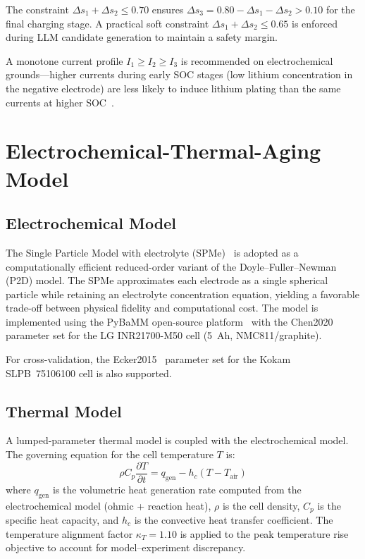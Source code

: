 \documentclass[journal]{IEEEtran}
\begin{document}
The constraint $\Delta s_1 + \Delta s_2 \leq 0.70$ ensures $\Delta s_3 = 0.80 - \Delta s_1 - \Delta s_2 > 0.10$ for the final charging stage. A practical soft constraint $\Delta s_1 + \Delta s_2 \leq 0.65$ is enforced during LLM candidate generation to maintain a safety margin.

A monotone current profile $I_1 \geq I_2 \geq I_3$ is recommended on electrochemical grounds---higher currents during early SOC stages (low lithium concentration in the negative electrode) are less likely to induce lithium plating than the same currents at higher SOC~\cite{ref2}.

\section{Electrochemical-Thermal-Aging Model}
\label{sec:model}

\subsection{Electrochemical Model}

The Single Particle Model with electrolyte (SPMe)~\cite{ref11} is adopted as a computationally efficient reduced-order variant of the Doyle--Fuller--Newman (P2D) model. The SPMe approximates each electrode as a single spherical particle while retaining an electrolyte concentration equation, yielding a favorable trade-off between physical fidelity and computational cost. The model is implemented using the PyBaMM open-source platform~\cite{ref12} with the Chen2020~\cite{ref13} parameter set for the LG INR21700-M50 cell (5~Ah, NMC811/graphite).

For cross-validation, the Ecker2015~\cite{ref14} parameter set for the Kokam SLPB~75106100 cell is also supported.

\subsection{Thermal Model}

A lumped-parameter thermal model is coupled with the electrochemical model. The governing equation for the cell temperature $T$ is:
\begin{equation}
\rho C_p \frac{\partial T}{\partial t} = q_{\text{gen}} - h_c (T - T_{\text{air}})
\label{eq:thermal}
\end{equation}
where $q_{\text{gen}}$ is the volumetric heat generation rate computed from the electrochemical model (ohmic + reaction heat), $\rho$ is the cell density, $C_p$ is the specific heat capacity, and $h_c$ is the convective heat transfer coefficient. The temperature alignment factor $\kappa_T = 1.10$ is applied to the peak temperature rise objective to account for model--experiment discrepancy.
\end{document}
